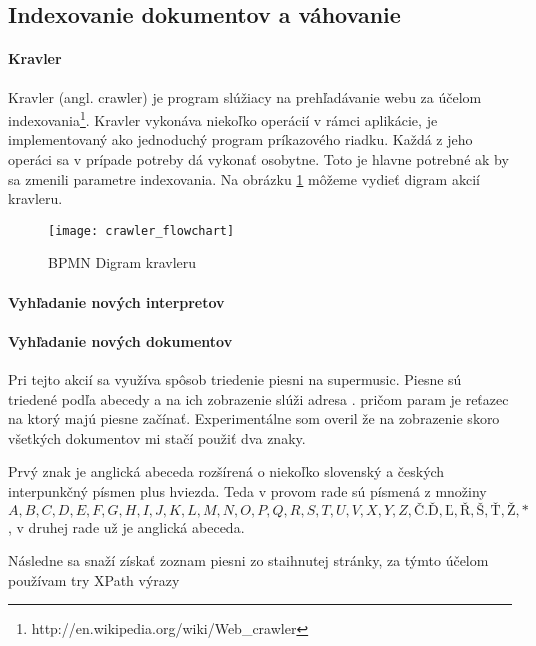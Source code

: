 \subsection{Indexovanie dokumentov a váhovanie}

\paragraph{Kravler}

Kravler (angl. crawler) je program slúžiacy na prehľadávanie webu za účelom
indexovania\footnote{http://en.wikipedia.org/wiki/Web\_crawler}. Kravler vykonáva niekoľko
operácií v rámci aplikácie, je implementovaný ako jednoduchý program príkazového riadku.
Každá z jeho operáci sa v prípade potreby dá vykonať osobytne. Toto je hlavne potrebné ak by
sa zmenili parametre indexovania. Na obrázku \ref{fig:crawler_flowchart} môžeme vydieť digram
akcií kravleru.

\begin{figure}
    \begin{center}
        \texttt{[image: crawler\_flowchart]}
        \caption{BPMN Digram kravleru}
        \label{fig:crawler_flowchart}
    \end{center}
\end{figure}

\paragraph{Vyhľadanie nových interpretov}

\paragraph{Vyhľadanie nových dokumentov}

Pri tejto akcií sa využíva spôsob triedenie piesni na supermusic. Piesne sú triedené podľa
abecedy a na ich zobrazenie slúži adresa .
pričom param je reťazec na ktorý majú piesne začínať. Experimentálne som overil že 
na zobrazenie skoro všetkých dokumentov mi stačí použiť dva znaky.

Prvý znak je anglická abeceda rozšírená o niekoľko slovenský a českých interpunkčný písmen
plus hviezda. Teda v provom rade sú písmená z množiny \({A, B, C, D, E, F, G, H, I, J, K, L, M,
N, O, P, Q, R, S, T, U, V, X, Y, Z, Č. Ď, Ľ, Ř, Š, Ť, Ž, *}\),
v druhej rade už je anglická abeceda.

Následne sa snaží získať zoznam piesni zo staihnutej stránky, za týmto účelom používam try
XPath výrazy

